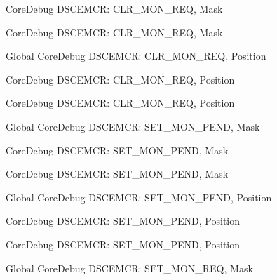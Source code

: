 \begin{DoxyRefList}
\label{deprecated__deprecated000523}%
%
Core\+Debug DSCEMCR\+: CLR\+\_\+\+MON\+\_\+\+REQ, Mask 

\label{deprecated__deprecated000625}%
%
Core\+Debug DSCEMCR\+: CLR\+\_\+\+MON\+\_\+\+REQ, Mask  
\item[Global \doxylink{group___c_m_s_i_s___s_c_b_ga1e2e3a310143f4663f1c415c03c3d535}{Core\+Debug\+\_\+\+DSCEMCR\+\_\+\+CLR\+\_\+\+MON\+\_\+\+REQ\+\_\+\+Pos} ]\label{deprecated__deprecated000522}%
%
Core\+Debug DSCEMCR\+: CLR\+\_\+\+MON\+\_\+\+REQ, Position 

\label{deprecated__deprecated000071}%
%
Core\+Debug DSCEMCR\+: CLR\+\_\+\+MON\+\_\+\+REQ, Position 

\label{deprecated__deprecated000624}%
%
Core\+Debug DSCEMCR\+: CLR\+\_\+\+MON\+\_\+\+REQ, Position  
\item[Global \doxylink{group___c_m_s_i_s___s_c_b_ga575045239507b73f338bcbb959ac6904}{Core\+Debug\+\_\+\+DSCEMCR\+\_\+\+SET\+\_\+\+MON\+\_\+\+PEND\+\_\+\+Msk} ]\label{deprecated__deprecated000078}%
%
Core\+Debug DSCEMCR\+: SET\+\_\+\+MON\+\_\+\+PEND, Mask 

\label{deprecated__deprecated000529}%
%
Core\+Debug DSCEMCR\+: SET\+\_\+\+MON\+\_\+\+PEND, Mask 

\label{deprecated__deprecated000631}%
%
Core\+Debug DSCEMCR\+: SET\+\_\+\+MON\+\_\+\+PEND, Mask  
\item[Global \doxylink{group___c_m_s_i_s___s_c_b_ga644ae3a13bcb9f2a80326bc5824f1b28}{Core\+Debug\+\_\+\+DSCEMCR\+\_\+\+SET\+\_\+\+MON\+\_\+\+PEND\+\_\+\+Pos} ]\label{deprecated__deprecated000077}%
%
Core\+Debug DSCEMCR\+: SET\+\_\+\+MON\+\_\+\+PEND, Position 

\label{deprecated__deprecated000630}%
%
Core\+Debug DSCEMCR\+: SET\+\_\+\+MON\+\_\+\+PEND, Position 

\label{deprecated__deprecated000528}%
%
Core\+Debug DSCEMCR\+: SET\+\_\+\+MON\+\_\+\+PEND, Position  
\item[Global \doxylink{group___c_m_s_i_s___s_c_b_ga73d8960abbd67eeda64f27a77ed7baf2}{Core\+Debug\+\_\+\+DSCEMCR\+\_\+\+SET\+\_\+\+MON\+\_\+\+REQ\+\_\+\+Msk} ]\label{deprecated__deprecated000076}%
%
Core\+Debug DSCEMCR\+: SET\+\_\+\+MON\+\_\+\+REQ, Mask 


\end{DoxyRefList}
